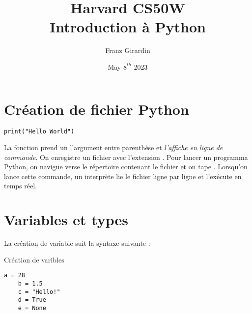 \documentclass{report}
\title{\Huge{Harvard CS50W}\\Introduction à Python}
\author{\huge{Franz Girardin}}
\date{May $8^{th}$ 2023}
\begin{document}
\maketitle

\newpage
{}
\tableofcontents
\pagebreak
% 
\chapter{Création de fichier Python}

\begin{EExample*}{}{}
\begin{lstlisting}[style=PythonDraculaWhite]
	print("Hello World") 
\end{lstlisting}
\end{EExample*}
\noindent La fonction  prend un l'argument entre parenthèse et 
\textit{l'affiche en ligne de commande}. On enregistre un fichier avec l'extension 
. Pour lancer un programma Python, on navigue verse le répertoire
contenant le fichier et on tape . Lorsqu'on lance cette commande, un interprète lie le fichier ligne par ligne et l'exécute en temps réel.  
% 
\chapter{Variables et types}
\begin{Syntaxe*}{}{}
La création de variable suit la syntaxe suivante : 
\end{Syntaxe*}

\begin{EExample*}{Création de varibles}{}
\begin{lstlisting}[style=PythonDraculaWhite]
	a = 28
    b = 1.5
    c = "Hello!"
    d = True
    e = None
\end{lstlisting}
\end{EExample*}
\end{document}
